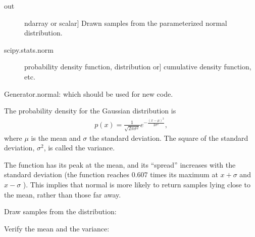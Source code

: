 \documentclass[letterpaper,10pt,english]{sphinxmanual}
\begin{document}
\begin{fulllineitems}
\begin{description}
\end{description}
\begin{description}
\item[{out}] \leavevmode{[}ndarray or scalar{]}
Drawn samples from the parameterized normal distribution.

\end{description}
\begin{description}
\item[{scipy.stats.norm}] \leavevmode{[}probability density function, distribution or{]}
cumulative density function, etc.

\end{description}

Generator.normal: which should be used for new code.

The probability density for the Gaussian distribution is
\begin{equation*}
\begin{split}p(x) = \frac{1}{\sqrt{ 2 \pi \sigma^2 }}
e^{ - \frac{ (x - \mu)^2 } {2 \sigma^2} },\end{split}
\end{equation*}
where \(\mu\) is the mean and \(\sigma\) the standard
deviation. The square of the standard deviation, \(\sigma^2\),
is called the variance.

The function has its peak at the mean, and its “spread” increases with
the standard deviation (the function reaches 0.607 times its maximum at
\(x + \sigma\) and \(x - \sigma\) \sphinxfootnotemark[2]).  This implies that
normal is more likely to return samples lying close to the mean, rather
than those far away.

Draw samples from the distribution:

\begin{sphinxVerbatim}[commandchars=\\\{\}]
     
    
\end{sphinxVerbatim}

Verify the mean and the variance:

\begin{sphinxVerbatim}[commandchars=\\\{\}]
  
\end{sphinxVerbatim}


\end{fulllineitems}
\end{document}
